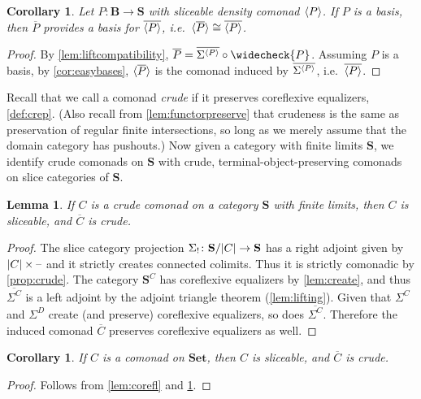 \documentclass[11pt, oneside, article]{memoir}
\theoremstyle{plain}
\newtheorem{corollary}[theorem]{Corollary}
\newtheorem{lemma}[theorem]{Lemma}
\theoremstyle{definition}
\theoremstyle{remark}
\DeclarePairedDelimiter{\gen}{\langle}{\rangle}
\DeclarePairedDelimiter{\abs}{\lvert}{\rvert}
\newcommand{\dash}{{\mathord{\text{--}}}}
\newcommand{\bang}{\mathrm{!}}
\newcommand{\namedcat}[1]{\mathbf{#1}}
\newcommand{\cat}[1]{\mathbf{#1}}
\newcommand{\Set}{\namedcat{Set}}
\newcommand{\CoalgOn}[2]{{#2}^{#1}}
\newcommand{\CoalgS}[1]{\CoalgOn{#1}{\bS}}
\newcommand{\clift}[1]{\overline{#1}}
\newcommand{\pts}[1]{{\abs{#1}}}
\newcommand{\lift}[1]{\widecheck{#1}}
\newcommand{\ptlift}[1]{\overline{#1}}
\newcommand{\carr}{\Sigma}
\newcommand{\slicel}{\Sigma_\bang}
\newcommand{\car}[1]{\carr^{#1}}
\newcommand{\carC}{\car{\cC}}
\newcommand{\carD}{\car{\cD}}
\newcommand{\carP}{\car{\cP}}
\newcommand{\ph}[1]{#1}
\newcommand{\cmnd}[1]{{#1}}
\newcommand{\cC}{\cmnd{C}}
\newcommand{\cD}{\cmnd{D}}
\newcommand{\bB}{\cat{B}}
\newcommand{\bS}{\cat{S}}
\newcommand{\pP}{\ph{P}}
\newcommand{\cP}{\gen{\pP}}
\newcommand{\lP}{\lift{\pP}}
\newcommand{\CS}{\CoalgS{\cC}}
\newcommand{\SC}{\bS/\pts{\cC}}
\begin{document}
\begin{corollary}\label{prop:liftbasis}
  Let $\pP \colon \bB \to \bS$ with sliceable density comonad $\cP$. If
  $\pP$ is a basis, then $\ptlift{\pP}$ provides a basis for
  $\clift{\cP}$, i.e.\ $\gen{\ptlift{\pP}} \cong \clift{\cP}$.
\end{corollary}
\begin{proof}
  By \cref{lem:liftcompatibility},
  $\ptlift{\pP} = \ptlift{\carP} \circ \lP$. Assuming $\pP$ is a
  basis, by \cref{cor:easybases}, $\gen{\ptlift{\pP}}$ is the comonad
  induced by $\ptlift{\carP}$, i.e.\ $\clift{\cP}$.
\end{proof}

Recall that we call a comonad \emph{crude} if it preserves coreflexive
equalizers, \cref{def:crep}. (Also recall from
\cref{lem:functorpreserve} that crudeness is the same as preservation
of regular finite intersections, so long as we merely assume that the
domain category has pushouts.)  Now given a category with finite
limits $\bS$, we identify crude comonads on $\bS$ with crude,
terminal-object-preserving comonads on slice categories of $\bS$.
  
\begin{lemma}\label{prop:factor}
  If $\cC$ is a crude comonad on a category $\bS$ with finite limits,
  then $\cC$ is sliceable, and $\clift{\cC}$ is crude.
\end{lemma}
\begin{proof}
  The slice category projection $\slicel \colon \SC\to \bS$ has a
  right adjoint given by $\pts{\cC} \times \dash$ and it strictly
  creates connected colimits. Thus it is strictly comonadic by
  \cref{prop:crude}. The category $\CS$ has coreflexive equalizers by
  \cref{lem:create}, and thus $\ptlift{\carC}$ is a left adjoint by
  the adjoint triangle theorem (\cref{lem:lifting}). Given that
  $\carC$ and $\carD$ create (and preserve) coreflexive equalizers, so
  does $\ptlift{\carC}$. Therefore the induced comonad $\clift{\cC}$
  preserves coreflexive equalizers as well.
\end{proof}

\begin{corollary}\label{cor:allslice}
  If $\cC$ is a comonad on $\Set$, then $\cC$ is sliceable, and
  $\clift{\cC}$ is crude.
\end{corollary}
\begin{proof}
  Follows from \cref{lem:corefl} and \cref{prop:factor}.
\end{proof}
\end{document}
